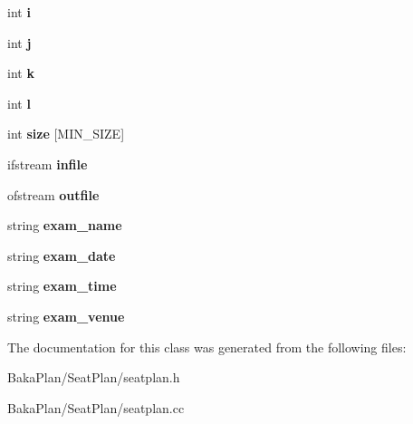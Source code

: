 \begin{DoxyCompactItemize}
\item 
\hypertarget{classSeatPlan_aa58731f5bc8a2e44ada7d0f51fc7a58f}{int {\bfseries i}}\label{classSeatPlan_aa58731f5bc8a2e44ada7d0f51fc7a58f}

\item 
\hypertarget{classSeatPlan_ae0d1fd49d01dd90160c5168fc6af41f7}{int {\bfseries j}}\label{classSeatPlan_ae0d1fd49d01dd90160c5168fc6af41f7}

\item 
\hypertarget{classSeatPlan_ab9f49d7c490fb81c6e3a1bad983e4956}{int {\bfseries k}}\label{classSeatPlan_ab9f49d7c490fb81c6e3a1bad983e4956}

\item 
\hypertarget{classSeatPlan_ad3a251bd1922b26e4c0297ae41704656}{int {\bfseries l}}\label{classSeatPlan_ad3a251bd1922b26e4c0297ae41704656}

\item 
\hypertarget{classSeatPlan_a83512de0480711b6c205fc5ed71891d1}{int {\bfseries size} \mbox{[}M\-I\-N\-\_\-\-S\-I\-Z\-E\mbox{]}}\label{classSeatPlan_a83512de0480711b6c205fc5ed71891d1}

\item 
\hypertarget{classSeatPlan_aba400a97d6ed6d615069106ec5db7dc4}{ifstream {\bfseries infile}}\label{classSeatPlan_aba400a97d6ed6d615069106ec5db7dc4}

\item 
\hypertarget{classSeatPlan_a6421c8e8a3a6c56619c4cef8108eca68}{ofstream {\bfseries outfile}}\label{classSeatPlan_a6421c8e8a3a6c56619c4cef8108eca68}

\item 
\hypertarget{classSeatPlan_a2ccc7b524acd261f6dbc19ec57a8c293}{string {\bfseries exam\-\_\-name}}\label{classSeatPlan_a2ccc7b524acd261f6dbc19ec57a8c293}

\item 
\hypertarget{classSeatPlan_a759e103a450eb0fce269b1d99a2beb3d}{string {\bfseries exam\-\_\-date}}\label{classSeatPlan_a759e103a450eb0fce269b1d99a2beb3d}

\item 
\hypertarget{classSeatPlan_a7a1b5a1057a3cd51567f4945a6eef5fc}{string {\bfseries exam\-\_\-time}}\label{classSeatPlan_a7a1b5a1057a3cd51567f4945a6eef5fc}

\item 
\hypertarget{classSeatPlan_a4e623288bfd7887069f69fdf8d233d76}{string {\bfseries exam\-\_\-venue}}\label{classSeatPlan_a4e623288bfd7887069f69fdf8d233d76}

\end{DoxyCompactItemize}


The documentation for this class was generated from the following files\-:\begin{DoxyCompactItemize}
\item 
Baka\-Plan/\-Seat\-Plan/seatplan.\-h\item 
Baka\-Plan/\-Seat\-Plan/seatplan.\-cc\end{DoxyCompactItemize}
